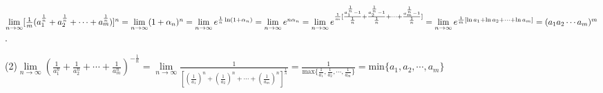 \documentclass[12pt,UTF8]{ctexart}
\begin{document}
\begin{enumerate}
$\lim\limits_{n\rightarrow\infty}[\frac1m(a_1^{\frac1n}+a_2^{\frac1n}+\cdots+a_m^{\frac1n})]^n=\lim\limits_{n\rightarrow\infty}(1+\alpha_n)^n=\lim\limits_{n\rightarrow\infty}e^{\frac1n\ln(1+\alpha_n)}=\lim\limits_{n\rightarrow\infty}e^{n\alpha_n}
\\=\lim\limits_{n\rightarrow\infty}e^{\frac1m[\frac{a_1^{\frac1n}-1}{\frac1n}+\frac{a_2^{\frac1n}-1}{\frac1n}+\cdots+\frac{a_m^{\frac1n}-1}{\frac1n}]}=\lim\limits_{n\rightarrow\infty}e^{\frac1m[\ln a_1+\ln a_2+\cdots+\ln a_m]}=(a_1a_2\cdots a_m)^m$.

(2)$\lim\limits_{n\rightarrow\infty}(\frac1{a_1^n}+\frac1{a_2^n}+\cdots+\frac1{a_m^n})^{-\frac1n}=\lim\limits_{n\rightarrow\infty}\frac1{[(\frac1{a_1})^n+(\frac1{a_2})^n+\cdots+(\frac1{a_m})^n]^{\frac1n}}=\frac1{\text{max}\{\frac1{a_1},\frac1{a_2},\cdots,\frac1{a_m}\}}=\text{min}\{a_1,a_2,\cdots,a_m\}$
\end{enumerate}
\end{document}
